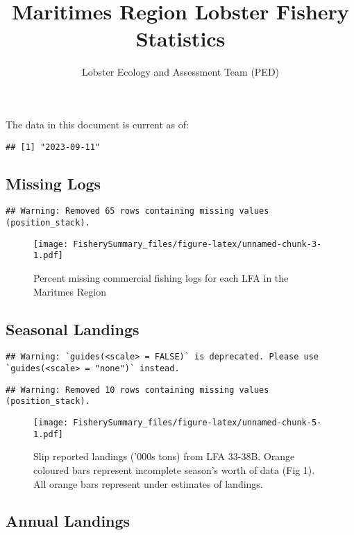 \documentclass[
]{article}
\title{Maritimes Region Lobster Fishery Statistics}
\author{Lobster Ecology and Assessment Team (PED)}
\date{}
\begin{document}
\maketitle

The data in this document is current as of:

\begin{verbatim}
## [1] "2023-09-11"
\end{verbatim}

\hypertarget{missing-logs}{%
\subsection{Missing Logs}\label{missing-logs}}

\begin{verbatim}
## Warning: Removed 65 rows containing missing values (position_stack).
\end{verbatim}

\begin{figure}
\centering
\texttt{[image: FisherySummary\_files/figure-latex/unnamed-chunk-3-1.pdf]}
\caption{Percent missing commercial fishing logs for each LFA in the
Maritmes Region}
\end{figure}

\newpage

\hypertarget{seasonal-landings}{%
\subsection{Seasonal Landings}\label{seasonal-landings}}

\begin{verbatim}
## Warning: `guides(<scale> = FALSE)` is deprecated. Please use `guides(<scale> = "none")` instead.
\end{verbatim}

\begin{verbatim}
## Warning: Removed 10 rows containing missing values (position_stack).
\end{verbatim}

\begin{figure}
\centering
\texttt{[image: FisherySummary\_files/figure-latex/unnamed-chunk-5-1.pdf]}
\caption{Slip reported landings ('000s tons) from LFA 33-38B. Orange
coloured bars represent incomplete season's worth of data (Fig 1). All
orange bars represent under estimates of landings.}
\end{figure}

\newpage

\hypertarget{annual-landings}{%
\subsection{Annual Landings}\label{annual-landings}}
\end{document}
